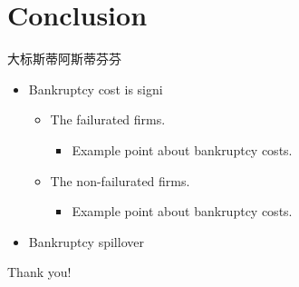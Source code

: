 \documentclass[aspectratio=169]{beamer}
\begin{document}
\section{Conclusion}
\begin{frame}{大标斯蒂阿斯蒂芬芬}
\begin{itemize}
    \item Bankruptcy cost is signi
    \begin{itemize}
        \item The failurated firms.
        \begin{itemize}
            \item Example point about bankruptcy costs.
        \end{itemize}
        \item The non-failurated firms.
        \begin{itemize}
            \item Example point about bankruptcy costs. 
        \end{itemize}
    \end{itemize}
    \item Bankruptcy spillover
\end{itemize}
\end{frame}

\begin{frame}
\Huge{\centerline{Thank you!}}
\end{frame}
\end{document}
